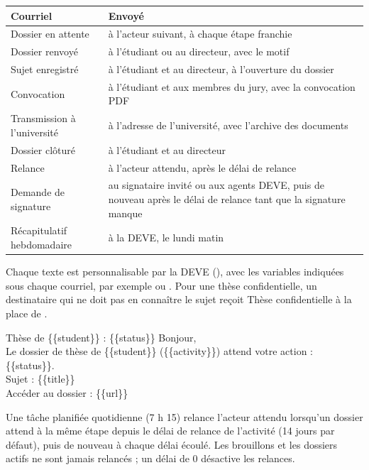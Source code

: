 \documentclass[11pt,a4paper]{article}
\begin{document}
\begin{center}
\small
\begin{tabularx}{\linewidth}{@{}l X@{}}
\toprule
\textbf{Courriel} & \textbf{Envoyé} \\
\midrule
Dossier en attente & à l'acteur suivant, à chaque étape franchie \\
Dossier renvoyé & à l'étudiant ou au directeur, avec le motif \\
Sujet enregistré & à l'étudiant et au directeur, à l'ouverture du dossier \\
Convocation & à l'étudiant et aux membres du jury, avec la convocation PDF \\
Transmission à l'université & à l'adresse de l'université, avec l'archive des documents \\
Dossier clôturé & à l'étudiant et au directeur \\
Relance & à l'acteur attendu, après le délai de relance \\
Demande de signature & au signataire invité ou aux agents DEVE, puis de nouveau
  après le délai de relance tant que la signature manque \\
Récapitulatif hebdomadaire & à la DEVE, le lundi matin \\
\bottomrule
\end{tabularx}
\end{center}


Chaque texte est personnalisable par la DEVE (), avec les
variables indiquées sous chaque courriel, par exemple  ou .
Pour une thèse confidentielle, un destinataire qui ne doit pas en connaître le
sujet reçoit \og Thèse confidentielle\fg{} à la place de .

\begin{courriel}{Thèse de \{\{student\}\} : \{\{status\}\}}
Bonjour,\\[2pt]
Le dossier de thèse de \{\{student\}\} (\{\{activity\}\}) attend votre action : \{\{status\}\}.\\[2pt]
Sujet : \{\{title\}\}\\[2pt]
Accéder au dossier : \{\{url\}\}
\end{courriel}

Une tâche planifiée quotidienne (7 h 15) relance l'acteur attendu lorsqu'un
dossier attend à la même étape depuis le délai de relance de l'activité
(14 jours par défaut), puis de nouveau à chaque délai écoulé. Les brouillons et
les dossiers actifs ne sont jamais relancés ; un délai de 0 désactive les
relances.
\end{document}
